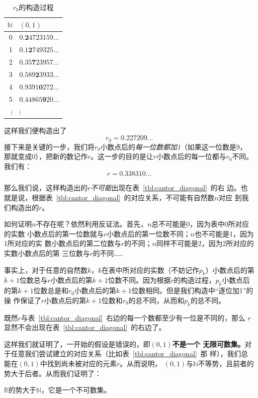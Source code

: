 \begin{table}[H]
    \centering
    \caption{$r_{0}$的构造过程}\label{tbl:cantor_diagonal_maker0}
    \begin{tabular}{r|l}
        $\mathbb{N}$& $\left( 0,1 \right) $\\
        \hline
        0 & $0.\mathbf{2}4723159\ldots $\\
        1 & $0.1\mathbf{2}749325\ldots $\\
        2 & $0.35\mathbf{7}23957\ldots $\\
        3 & $0.589\mathbf{2}3933\ldots $\\
        4 & $0.9391\mathbf{0}272\ldots $\\
        5 & $0.44865\mathbf{9}20\ldots $\\
        $\vdots$ & $\vdots$
    \end{tabular}
\end{table}

这样我们便构造出了
\[
    r_{0}=0.227209\ldots 
\]
接下来是关键的一步，我们将$r_{0}$小数点后的\emph{每一位数都加1}（如果这一位数是9，
那就变成0），把新的数记作$r$。这一步的目的是让$r$小数点后的每一位都与$r_{0}$不同。
我们有：
\[
    r=0.338310\ldots 
\]

那么我们说，这样构造出的$r$\emph{不可能}出现在表~\ref{tbl:cantor_diagonal}~的右
边。也就是说，根据表~\ref{tbl:cantor_diagonal}~的对应关系，不可能有自然数$n$对应
到我们构造出的$r$。

如何证明$n$不存在呢？依然利用反证法。首先，$n$总不可能是0，因为表中0所对应的实数
小数点后的第一位数就与$r$小数点后的第一位数不同；$n$也不可能是1，因为1所对应的实
数小数点后的第二位数与$r$的不同；$n$同样不可能是2，因为2所对应的实数小数点后的第
三位数与$r$的不同……

事实上，对于任意的自然数$k$，$k$在表中所对应的实数（不妨记作$p_k$）小数点后的第
$k+1$位数总与$r$小数点后的第$k+1$位数不同。因为根据$r$的构造过程，$p_k$小数点后
的第$k+1$位数总是和$r_{0}$小数点后的第$k+1$位数相同。但是我们构造中“逐位加1”的操
作保证了$r$小数点后的第$k+1$位数和$r_{0}$的总不同，从而和$p_k$的总不同。

既然$r$与表~\ref{tbl:cantor_diagonal}~右边的每一个数都至少有一位是不同的，那么
$r$显然不会出现在表~\ref{tbl:cantor_diagonal}~的右边了。

这样我们就证明了，一开始的假设是错误的，即\textbf{$\left( 0,1 \right) $不是一个
无限可数集。}对于任意我们尝试建立的对应关系（比如表~\ref{tbl:cantor_diagonal}~那
样），我们总能在$\left( 0,1 \right) $中找到尚未被对应的元素$r$。从而说明，
$\left( 0,1 \right) $与$\mathbb{N}$不等势，且前者的势大于后者。从而我们证明了：

\begin{rawthm}
    $\mathbb{R}$的势大于$\mathbb{N}$，它是一个不可数集。
\end{rawthm}



